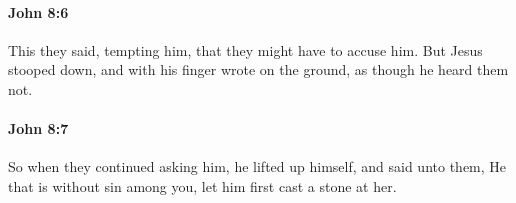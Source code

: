 		\paragraph{John 8:6} %
			\label{JOHN-8-6}

			This they said, tempting him, that they might have to accuse him. But Jesus stooped down, and with his finger wrote on the ground, as though he heard them not.

			\begin{framed}
				\scriptsize
				\begin{compactdesc}
					\item[SBLG] 
				\end{compactdesc}
			\end{framed}

		\paragraph{John 8:7} %
			\label{JOHN-8-7}

			So when they continued asking him, he lifted up himself, and said unto them, He that is without sin among you, let him first cast a stone at her.

